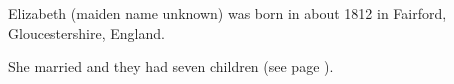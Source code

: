 
Elizabeth (maiden name unknown) was born in about 1812 in Fairford, Gloucestershire, England.\cite{Census1861Merrett}

She married  and they had seven children (see page \pageref{James_Merrett}).
